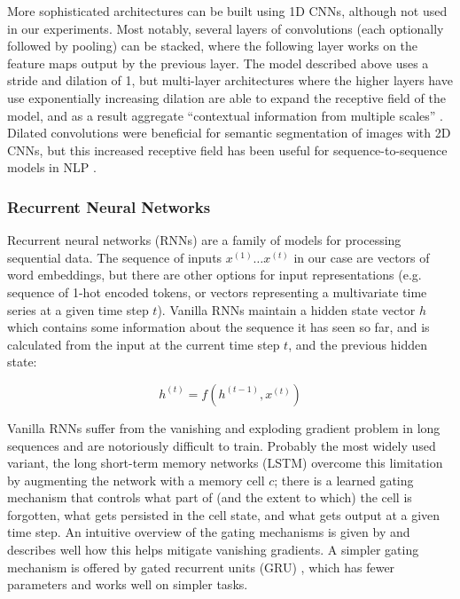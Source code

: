 More sophisticated architectures can be built using 1D CNNs, although not used in our experiments.
Most notably, several layers of convolutions (each optionally followed by pooling) can be stacked, where the following layer works on the feature maps output by the previous layer.
The model described above uses a stride and dilation of 1, but multi-layer architectures where the higher layers have use exponentially increasing dilation are able to expand the receptive field of the model, and as a result aggregate ``contextual information from multiple scales'' \cite{dilated}.
Dilated convolutions were beneficial for semantic segmentation of images with 2D CNNs, but this increased receptive field has been useful for sequence-to-sequence models in NLP \cite{dilated_decoder}.

\subsubsection{Recurrent Neural Networks}
\label{rnn}

Recurrent neural networks (RNNs) are a family of models for processing sequential data.
The sequence of inputs $x^{(1)} \dots x^{(t)}$ in our case are vectors of word embeddings, but there are other options for input representations (e.g. sequence of 1-hot encoded tokens, or vectors representing a multivariate time series at a given time step $t$).
Vanilla RNNs maintain a hidden state vector $h$ which contains some information about the sequence it has seen so far, and is calculated from the input at the current time step $t$, and the previous hidden state:

\begin{equation}
  h^{(t)} = f(h^{(t-1)},x^{(t)})
\end{equation}

Vanilla RNNs suffer from the vanishing and exploding gradient problem in long sequences and are notoriously difficult to train.
Probably the most widely used variant, the long short-term memory networks (LSTM) \cite{lstm} overcome this limitation by augmenting the network with a memory cell $c$; there is a learned gating mechanism that controls what part of (and the extent to which) the cell is forgotten, what gets persisted in the cell state, and what gets output at a given time step.
An intuitive overview of the gating mechanisms is given by \cite{colah} and \cite{vanishing} describes well how this helps mitigate vanishing gradients.
A simpler gating mechanism is offered by gated recurrent units (GRU) \cite{gru}, which has fewer parameters and works well on simpler tasks.

